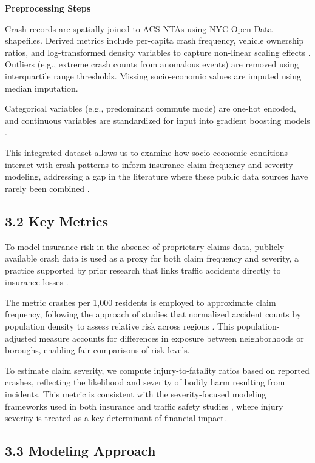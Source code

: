 \documentclass[
  number,
  review,
  3p]{elsarticle}
\begin{document}
\textbf{Preprocessing Steps}

Crash records are spatially joined to ACS NTAs using NYC Open Data
shapefiles. Derived metrics include per-capita crash frequency, vehicle
ownership ratios, and log-transformed density variables to capture
non-linear scaling effects \citep{cabrera}. Outliers (e.g., extreme
crash counts from anomalous events) are removed using interquartile
range thresholds. Missing socio-economic values are imputed using median
imputation.

Categorical variables (e.g., predominant commute mode) are one-hot
encoded, and continuous variables are standardized for input into
gradient boosting models \citep{henckaerts}.

This integrated dataset allows us to examine how socio-economic
conditions interact with crash patterns to inform insurance claim
frequency and severity modeling, addressing a gap in the literature
where these public data sources have rarely been combined
\citep{mohamed, jonkheijm}.

\subsection{3.2 Key Metrics}\label{key-metrics}

To model insurance risk in the absence of proprietary claims data,
publicly available crash data is used as a proxy for both claim
frequency and severity, a practice supported by prior research that
links traffic accidents directly to insurance losses
\citep{adeniyi, dong}.

The metric crashes per 1,000 residents is employed to approximate claim
frequency, following the approach of studies that normalized accident
counts by population density to assess relative risk across regions
\citep{brubacher, cabrera}. This population-adjusted measure accounts
for differences in exposure between neighborhoods or boroughs, enabling
fair comparisons of risk levels.

To estimate claim severity, we compute injury-to-fatality ratios based
on reported crashes, reflecting the likelihood and severity of bodily
harm resulting from incidents. This metric is consistent with the
severity-focused modeling frameworks used in both insurance
\citep{clemente, henckaerts} and traffic safety studies \citep{dong},
where injury severity is treated as a key determinant of financial
impact.

\subsection{3.3 Modeling Approach}\label{modeling-approach}
\end{document}
